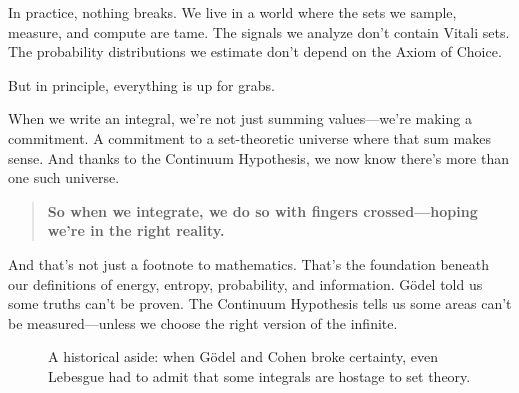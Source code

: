 In practice, nothing breaks. We live in a world where the sets we sample, measure, and compute are tame. The signals we analyze don’t contain Vitali sets. The probability distributions we estimate don’t depend on the Axiom of Choice.

But in principle, everything is up for grabs.

When we write an integral, we’re not just summing values—we’re making a commitment. A commitment to a set-theoretic universe where that sum makes sense. And thanks to the Continuum Hypothesis, we now know there’s more than one such universe.

\begin{quote}
\textbf{So when we integrate, we do so with fingers crossed—hoping we’re in the right reality.}
\end{quote}

And that’s not just a footnote to mathematics. That’s the foundation beneath our definitions of energy, entropy, probability, and information. Gödel told us some truths can’t be proven. The Continuum Hypothesis tells us some areas can’t be measured—unless we choose the right version of the infinite.








\begin{figure}[H]
\centering
{}
\caption{
A historical aside: when Gödel and Cohen broke certainty, even Lebesgue had to admit that some integrals are hostage to set theory.
}
\end{figure}












